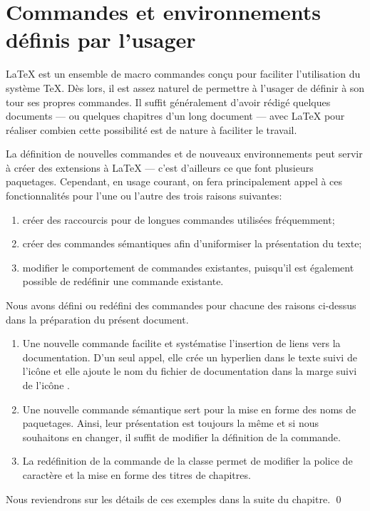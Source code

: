 \chapter{Commandes et environnements définis par l'usager}
\label{chap:commandes}

{\LaTeX} est un ensemble de macro commandes conçu pour faciliter
l'utilisation du système {\TeX}. Dès lors, il est assez naturel de
permettre à l'usager de définir à son tour ses propres commandes. Il
suffit généralement d'avoir rédigé quelques documents --- ou quelques
chapitres d'un long document --- avec {\LaTeX} pour réaliser combien
cette possibilité est de nature à faciliter le travail.

La définition de nouvelles commandes et de nouveaux environnements
peut servir à créer des extensions à {\LaTeX} --- c'est d'ailleurs ce
que font plusieurs paquetages. Cependant, en usage courant, on fera
principalement appel à ces fonctionnalités pour l'une ou l'autre des
trois raisons suivantes:

\begin{enumerate}
\item créer des raccourcis pour de longues commandes utilisées
  fréquemment;
\item créer des commandes sémantiques afin d'uniformiser la
  présentation du texte;
\item modifier le comportement de commandes existantes, puisqu'il est
  également possible de redéfinir une commande existante.
\end{enumerate}

\begin{exemple}
  \label{ex:commandes:intro}
  Nous avons défini ou redéfini des commandes pour chacune des raisons
  ci-dessus dans la préparation du présent document.
  \begin{enumerate}
  \item Une nouvelle commande \cmdprint{\doc} facilite et systématise
    l'insertion de liens vers la documentation. D'un seul appel, elle
    crée un hyperlien dans le texte suivi de l'icône {\faExternalLink}
    et elle ajoute le nom du fichier de documentation dans la marge
    suivi de l'icône {\faBook}.
  \item Une nouvelle commande sémantique \cmdprint{\pkg} sert pour la
    mise en forme des noms de paquetages. Ainsi, leur présentation est
    toujours la même et si nous souhaitons en changer, il suffit de
    modifier la définition de la commande.
  \item La redéfinition de la commande \cmd{\chaptitlefont} de la
    classe  permet de modifier la police de caractère et
    la mise en forme des titres de chapitres.
  \end{enumerate}
  Nous reviendrons sur les détails de ces exemples dans la suite du
  chapitre. %
  \qed
\end{exemple}



